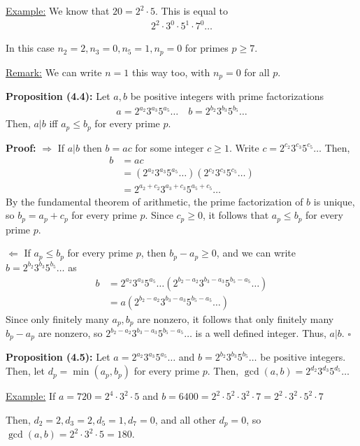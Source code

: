 \documentclass{article}
\newcommand*{\qed}{\hfill$\square$}%
\begin{document}
\underline{Example:} We know that $20=2^2\cdot 5$. This is equal to \begin{align*}
    2^2\cdot 3^0 \cdot 5^1 \cdot 7^0 \dots
\end{align*}

In this case $n_2=2, n_3=0, n_5=1, n_p=0$ for primes $p\geq 7$. 

\underline{Remark:} We can write $n=1$ this way too, with $n_p=0$ for all $p$. 

\textbf{Proposition (4.4):} Let $a,b$ be positive integers with prime factorizations \begin{align*}
    a=2^{a_2}3^{a_3}5^{a_5}\dots \quad b=2^{b_2}3^{b_3}5^{b_5}\dots
\end{align*}
Then, $a|b$ iff $a_p\leq b_p$ for every prime $p$. 

\textbf{Proof:} $\Rightarrow$ If $a|b$ then $b=ac$ for some integer $c\geq 1$. Write $c=2^{c_2}3^{c_3}5^{c_5}\dots$ Then, \begin{align*}
    b &= ac \\
      &= (2^{a_2}3^{a_3}5^{a_5}\dots)(2^{c_2}3^{c_3}5^{c_5}\dots) \\
      &= 2^{a_2+c_2}3^{a_3+c_3}5^{a_5+c_5}\dots
\end{align*}By the fundamental theorem of arithmetic, the prime factorization of $b$ is unique, so $b_p=a_p+c_p$ for every prime $p$. Since $c_p\geq 0$, it follows that $a_p\leq b_p$ for every prime $p$.

$\Leftarrow$ If $a_p\leq b_p$ for every prime $p$, then $b_p-a_p\geq 0$, and we can write $b=2^{b_2}3^{b_3}5^{b_5}\dots$ as \begin{align*}
    b &= 2^{a_2}3^{a_3}5^{a_5}\dots (2^{b_2-a_2}3^{b_3-a_3}5^{b_5-a_5}\dots) \\
      &= a(2^{b_2-a_2}3^{b_3-a_3}5^{b_5-a_5}\dots)
\end{align*}Since only finitely many $a_p, b_p$ are nonzero, it follows that only finitely many $b_p-a_p$ are nonzero, so $2^{b_2-a_2}3^{b_3-a_3}5^{b_5-a_5}\dots$ is a well defined integer. Thus, $a|b$. \qed

\textbf{Proposition (4.5):} Let $a=2^{a_2}3^{a_3}5^{a_5}\dots$ and $b=2^{b_2}3^{b_3}5^{b_5}\dots$ be positive integers. Then, let $d_p=\min(a_p,b_p)$ for every prime $p$. Then, $\gcd(a,b)=2^{d_2}3^{d_3}5^{d_5}\dots$

\underline{Example:} If $a=720=2^4\cdot 3^2 \cdot 5$ and $b=6400=2^2\cdot 5^2 \cdot 3^2\cdot 7=2^2\cdot 3^2\cdot 5^2\cdot 7$

Then, $d_2=2, d_3=2, d_5=1, d_7=0$, and all other $d_p=0$, so $\gcd(a,b)=2^2\cdot 3^2 \cdot 5 = 180$.
\end{document}
